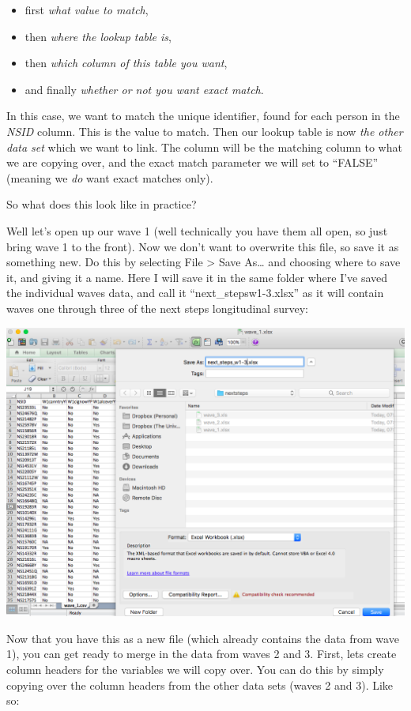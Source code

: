 \documentclass[]{book}
\providecommand{\tightlist}{%
  \setlength{\itemsep}{0pt}\setlength{\parskip}{0pt}}
\theoremstyle{definition}
\theoremstyle{definition}
\theoremstyle{definition}
\theoremstyle{remark}
\begin{document}
\begin{itemize}
\tightlist
\item
  first \emph{what value to match},
\item
  then \emph{where the lookup table is},
\item
  then \emph{which column of this table you want},
\item
  and finally \emph{whether or not you want exact match}.
\end{itemize}

In this case, we want to match the unique identifier, found for each
person in the \emph{NSID} column. This is the value to match. Then our
lookup table is now \emph{the other data set} which we want to link. The
column will be the matching column to what we are copying over, and the
exact match parameter we will set to ``FALSE'' (meaning we \emph{do}
want exact matches only).

So what does this look like in practice?

Well let's open up our wave 1 (well technically you have them all open,
so just bring wave 1 to the front). Now we don't want to overwrite this
file, so save it as something new. Do this by selecting File
\textgreater{} Save As\ldots{} and choosing where to save it, and giving
it a name. Here I will save it in the same folder where I've saved the
individual waves data, and call it ``next\_stepsw1-3.xlsx'' as it will
contain waves one through three of the next steps longitudinal survey:

\includegraphics{imgs/rename.png}

Now that you have this as a new file (which already contains the data
from wave 1), you can get ready to merge in the data from waves 2 and 3.
First, lets create column headers for the variables we will copy over.
You can do this by simply copying over the column headers from the other
data sets (waves 2 and 3). Like so:
\end{document}
